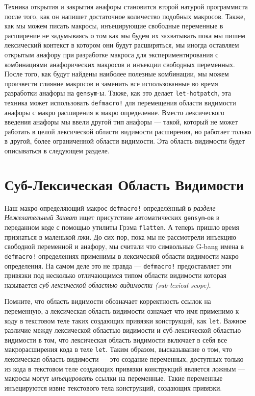 Техника открытия и закрытия анафоры становится второй натурой программиста после того, как он напишет достаточное количество подобных макросов. Также, как мы можем писать макросы, инъецирующие свободные переменные в расширение не задумываясь о том как мы будем их захватывать пока мы пишем лексический контекст в котором они будут расширяться, мы иногда оставляем открытым анафору при разработке макроса для экспериментирования с комбинациями анафорических макросов и инъекции свободных переменных. После того, как будут найдены наиболее полезные комбинации, мы можем произвести слияние макросов и заменить все использованные во время разработки анафоры на \verb"gensym"-ы. Также, как это делает \verb"let-hotpatch", эта техника может использовать \verb"defmacro!" для перемещения области видимости анафоры с макро расширения в макро определение. Вместо лексического введения анафоры мы ввели другой тип анафоры --- такой, который не может работать в целой лексической области видимости расширения, но работает только в другой, более ограниченной области видимости. Эта область видимости будет описываться в следующем разделе.

\section{Суб-Лексическая Область Видимости}\label{section_sub-lexical_scope}


Наш макро-определяющий макрос \verb"defmacro!" определённый в \emph{разделе Нежелательный Захват} ищет присутствие автоматических \verb"gensym"-ов в переданном коде с помощью утилиты Грэма \verb"flatten". А теперь пришло время признаться в маленькой лжи. До сих пор, пока мы не рассмотрели инъекцию свободной переменной и анафору, мы считали что символьные G-bang имена в \verb"defmacro!" определениях применимы в лексической области видимости макро определения. На самом деле это не правда --- \verb"defmacro!" предоставляет эти привязки под несколько отличающимся типом области видимости которая называется \emph{суб-лексической областью видимости (sub-lexical scope)}.

Помните, что область видимости обозначает корректность ссылок на переменную, а лексическая область видимости означает что имя применимо к коду в текстовом теле таких создающих привязки конструкций, как \verb"let". Важное различие между лексической областью видимости и суб-лексической областью видимости в том, что лексическая область видимости включает в себя все макрорасширения кода в теле \verb"let". Таким образом, высказывание о том, что лексическая область видимости --- это создание переменных, доступных только из кода в текстовом теле создающих привязки конструкций является ложным --- макросы могут \emph{инъецировать} ссылки на переменные. Такие переменные инъецируются извне текстового тела конструкций, создающих привязки.

